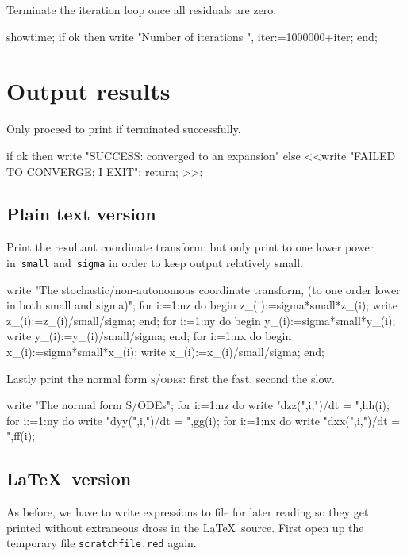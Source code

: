 \documentclass[11pt,a5paper]{article}
\def\sde{\textsc{s/ode}}
\begin{document}
Terminate the iteration loop once all residuals are zero.
\begin{reduce}
  showtime;
  if ok then write "Number of iterations ",
    iter:=1000000+iter;
end;
\end{reduce}





\section{Output results}

Only proceed to print if terminated successfully.
\begin{reduce}
if ok 
  then write "SUCCESS: converged to an expansion"
  else <<write "FAILED TO CONVERGE; I EXIT";
    return; >>;
\end{reduce}


\subsection{Plain text version}

Print the resultant coordinate transform: but only print to
one lower power in~\verb|small| and~\verb|sigma| in order to
keep output relatively small.
\begin{reduce}
write "The stochastic/non-autonomous coordinate transform,
(to one order lower in both small and sigma)";
for i:=1:nz do begin z_(i):=sigma*small*z_(i); 
               write z_(i):=z_(i)/small/sigma; end;
for i:=1:ny do begin y_(i):=sigma*small*y_(i); 
               write y_(i):=y_(i)/small/sigma; end;
for i:=1:nx  do begin x_(i):=sigma*small*x_(i); 
               write x_(i):=x_(i)/small/sigma; end;
\end{reduce}

Lastly print the normal form \sde{}s: first the fast, second
the slow.
\begin{reduce}
write "The normal form S/ODEs";
for i:=1:nz do write "dzz(",i,")/dt = ",hh(i);
for i:=1:ny do write "dyy(",i,")/dt = ",gg(i);
for i:=1:nx do write "dxx(",i,")/dt = ",ff(i);
\end{reduce}



\subsection{\LaTeX\ version}

As before, we have to write expressions to file for later
reading so they get printed without extraneous dross in the
\LaTeX\ source. First open up the temporary file
\verb|scratchfile.red| again.
\end{document}
